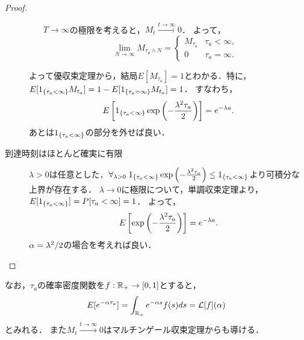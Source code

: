 \documentclass[uplatex,dvipdfmx]{jsreport}
\begin{document}
\begin{proof}
\begin{description}
\begin{enumerate}[(a)]
            $T\to\infty$の極限を考えると，$M_t\xrightarrow{t\to\infty}0$．
            よって，
            \[\lim_{N\to\infty}M_{\tau_a\land N}=\begin{cases}
                M_{\tau_a}&\tau_a<\infty,\\
                0&\tau_a=\infty.
            \end{cases}\]
        \end{enumerate}
        よって優収束定理から，結局$E[M_{\tau_a}]=1$とわかる．特に，
        $E[1_{\left\{\tau_a<\infty\right\}}M_{t_a}]=1-E[1_{\left\{\tau_a=\infty\right\}}M_{t_a}]=1$．
        すなわち，
        \[E\left[1_{\left\{\tau_a<\infty\right\}}\exp\left(-\frac{\lambda^2\tau_a}{2}\right)\right]=e^{-\lambda a}.\]
        あとは$1_{\left\{\tau_a<\infty\right\}}$の部分を外せば良い．
        \item[到達時刻はほとんど確実に有限] \mbox{}
        $\lambda>0$は任意とした．$\forall_{\lambda>0}\;1_{\left\{\tau_a<\infty\right\}}\exp\left(-\frac{\lambda^2\tau_a}{2}\right)\le1_{\left\{\tau_a<\infty\right\}}$より可積分な上界が存在する．
        $\lambda\to0$に極限について，単調収束定理より，$E[1_{\left\{\tau_a<\infty\right\}}]=P[\tau_a<\infty]=1$．
        よって，
        \[E\left[\exp\left(-\frac{\lambda^2\tau_a}{2}\right)\right]=e^{-\lambda a}.\]
        $\alpha=\lambda^2/2$の場合を考えれば良い．
    \end{description}
\end{proof}
\begin{remarks}
    なお，$\tau_a$の確率密度関数を$f:\mathbb{R}_+\to[0,1]$とすると，
    \[E[e^{-\alpha\tau_a}]=\int_{\mathbb{R}_+}e^{-\alpha s}f(s)ds=\mathcal{L}[f](\alpha)\]
    とみれる．
    また$M_t\xrightarrow{t\to\infty}0$はマルチンゲール収束定理からも導ける．
\end{remarks}
\end{document}

